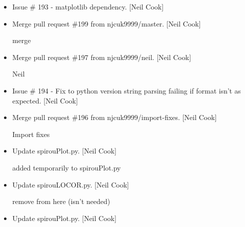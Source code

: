 \documentclass[a4paper,10pt,english]{report}
\begin{document}
\begin{itemize}
\item {} 
Issue \# 193 - matplotlib dependency. {[}Neil Cook{]}

\item {} 
Merge pull request \#199 from njcuk9999/master. {[}Neil Cook{]}

merge

\item {} 
Merge pull request \#197 from njcuk9999/neil. {[}Neil Cook{]}

Neil

\item {} 
Issue \# 194 - Fix to python version string parsing failing if format
isn’t as expected. {[}Neil Cook{]}

\item {} 
Merge pull request \#196 from njcuk9999/import-fixes. {[}Neil Cook{]}

Import fixes

\item {} 
Update spirouPlot.py. {[}Neil Cook{]}

added  temporarily to spirouPlot.py

\item {} 
Update spirouLOCOR.py. {[}Neil Cook{]}

remove  from here (isn’t needed)

\item {} 
Update spirouPlot.py. {[}Neil Cook{]}

\end{itemize}
\end{document}
